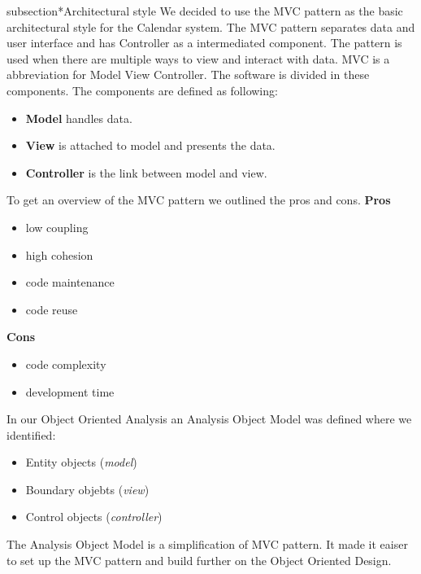 subsection*{Architectural style}
\newline
 We decided to use the MVC pattern as the basic architectural style for the Calendar system.
\newline
\newline
The MVC pattern separates data and user interface and has Controller as a intermediated component. The pattern is used when there are multiple ways to view and interact with data.
\newline
\newline
MVC is a abbreviation for Model View Controller. The software is divided in these components. The components are defined as following:
\begin{itemize}
	\item \textbf{Model} handles data.
	\item \textbf{View} is attached to model and presents the data.
	\item \textbf{Controller} is the link between model and view. 
\end{itemize}
\bigskip


To get an overview of the MVC pattern we outlined the pros and cons.
\newline
\textbf{Pros}
\begin{itemize}
	\item low coupling
	\item high cohesion
	\item code maintenance
	\item code reuse
\end{itemize}
\textbf{Cons}
\begin{itemize}
	\item code complexity
	\item development time
\end{itemize}

\newpage
In our Object Oriented Analysis an Analysis Object Model was defined where we identified:
\begin{itemize}
	\item Entity objects (\emph{model})
	\item Boundary objebts (\emph{view})
	\item Control objects (\emph{controller})
\end{itemize}


The Analysis Object Model is a simplification of MVC pattern. It made it eaiser to set up the MVC pattern and build further on the Object Oriented Design. 

